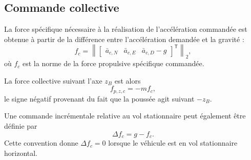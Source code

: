 \documentclass[11pt,a4paper,oneside]{report}
\newcommand{\trans}{^{\mathsf T}}
\newcommand{\norm}[1]{\left\lVert#1\right\rVert}
\begin{document}
\subsection{Commande collective}

La force spécifique nécessaire à la réalisation de l'accélération commandée est obtenue à partir de la différence entre l'accélération demandée et la gravité :
\begin{equation}
	f_c
	=
	\norm{
		\begin{bmatrix}
			\bar a_{c,N} &
			\bar a_{c,E} &
			\bar a_{c,D}-g
		\end{bmatrix}\trans
	}_2,
	\label{eq_collective_specific_force}
\end{equation}
où $f_c$ est la norme de la force propulsive spécifique commandée.

La force collective suivant l'axe $z_B$ est alors
\begin{equation}
	f_{p,z,c}
	=
	-m f_c,
	\label{eq_collective_force_command}
\end{equation}
le signe négatif provenant du fait que la poussée agit suivant $-z_B$.

Une commande incrémentale relative au vol stationnaire peut également être définie par
\begin{equation}
	\Delta f_c
	=
	g-f_c.
	\label{eq_collective_command}
\end{equation}
Cette convention donne $\Delta f_c=0$ lorsque le véhicule est en vol stationnaire horizontal.
\end{document}
